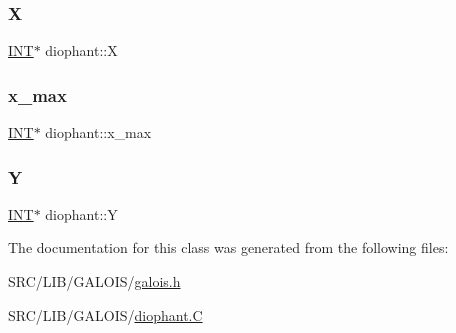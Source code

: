 \mbox{\label{classdiophant_a5c712bff780bf353e9d8c64f734376c8}} 
\subsubsection{\texorpdfstring{X}{X}}
{\footnotesize\ttfamily \mbox{\hyperlink{galois_8h_a09fddde158a3a20bd2dcadb609de11dc}{I\+NT}}$\ast$ diophant\+::X}

\mbox{\label{classdiophant_a0cf4d936d782021b52016616ca02286c}} 
\subsubsection{\texorpdfstring{x\+\_\+max}{x\_max}}
{\footnotesize\ttfamily \mbox{\hyperlink{galois_8h_a09fddde158a3a20bd2dcadb609de11dc}{I\+NT}}$\ast$ diophant\+::x\+\_\+max}

\mbox{\label{classdiophant_af1210d1ada55984684ad6400b1df9335}} 
\subsubsection{\texorpdfstring{Y}{Y}}
{\footnotesize\ttfamily \mbox{\hyperlink{galois_8h_a09fddde158a3a20bd2dcadb609de11dc}{I\+NT}}$\ast$ diophant\+::Y}



The documentation for this class was generated from the following files\+:\begin{DoxyCompactItemize}
\item 
S\+R\+C/\+L\+I\+B/\+G\+A\+L\+O\+I\+S/\mbox{\hyperlink{galois_8h}{galois.\+h}}\item 
S\+R\+C/\+L\+I\+B/\+G\+A\+L\+O\+I\+S/\mbox{\hyperlink{diophant_8_c}{diophant.\+C}}\end{DoxyCompactItemize}
